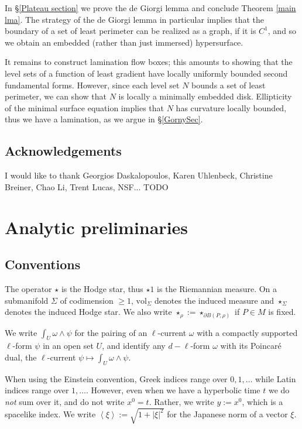 \documentclass[reqno,10pt]{amsart}
\newcommand{\vol}{\mathrm{vol}}
\def\Japan#1{\left \langle #1 \right \rangle}
\theoremstyle{definition}
\numberwithin{equation}{section}
\begin{document}
In \S\ref{Plateau section} we prove the de Giorgi lemma and conclude Theorem \ref{main lma}.
The strategy of the de Giorgi lemma in particular implies that the boundary of a set of least perimeter can be realized as a graph, if it is $C^1$, and so we obtain an embedded (rather than just immersed) hypersurface.

It remains to construct lamination flow boxes; this amounts to showing that the level sets of a function of least gradient have locally uniformly bounded second fundamental forms.
However, since each level set $N$ bounds a set of least perimeter, we can show that $N$ is locally a minimally embedded disk.
Ellipticity of the minimal surface equation implies that $N$ has curvature locally bounded, thus we have a lamination, as we argue in \S\ref{GornySec}.


\subsection{Acknowledgements}
I would like to thank Georgios Daskalopoulos, Karen Uhlenbeck, Christine Breiner, Chao Li, Trent Lucas, NSF... TODO



\section{Analytic preliminaries}\label{Prelims}
\subsection{Conventions}
The operator $\star$ is the Hodge star, thus $\star 1$ is the Riemannian measure.
On a submanifold $\Sigma$ of codimension $\geq 1$, $\vol_\Sigma$ denotes the induced measure and $\star_\Sigma$ denotes the induced Hodge star. We also write $\star_\rho := \star_{\partial B(P, \rho)}$ if $P \in M$ is fixed.

We write $\int_U \omega \wedge \psi$ for the pairing of an $\ell$-current $\omega$ with a compactly supported $\ell$-form $\psi$ in an open set $U$, and identify any $d - \ell$-form $\omega$ with its Poincar\'e dual, the $\ell$-current $\psi \mapsto \int_U \omega \wedge \psi$.

When using the Einstein convention, Greek indices range over $0, 1, \dots$ while Latin indices range over $1, \dots$.
However, even when we have a hyperbolic time $t$ we do \emph{not} sum over it, and do not write $x^0 = t$.
Rather, we write $y := x^0$, which is a spacelike index.
We write $\Japan \xi := \sqrt{1 + |\xi|^2}$ for the Japanese norm of a vector $\xi$.
\end{document}
